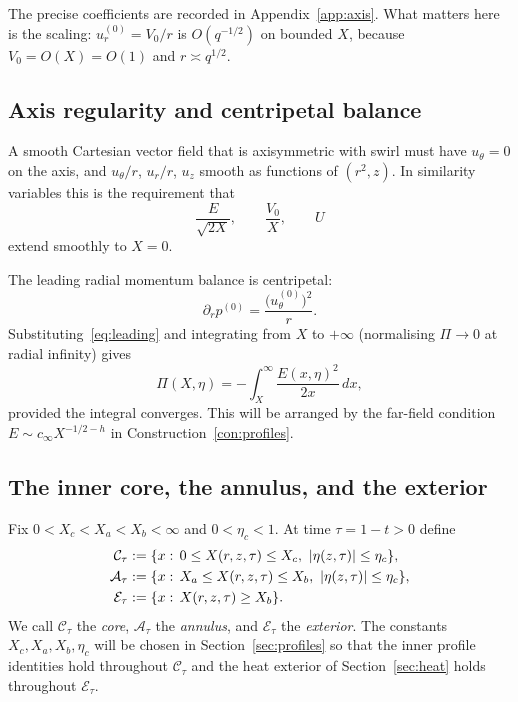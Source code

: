 The precise coefficients are recorded in Appendix~\ref{app:axis}. What matters here is the scaling: $u^{(0)}_r=V_0/r$ is $O(q^{-1/2})$ on bounded $X$, because $V_0=O(X)=O(1)$ and $r\asymp q^{1/2}$.

\subsection{Axis regularity and centripetal balance}

A smooth Cartesian vector field that is axisymmetric with swirl must have $u_\theta=0$ on the axis, and $u_\theta/r$, $u_r/r$, $u_z$ smooth as functions of $(r^2,z)$. In similarity variables this is the requirement that
\[
\frac{E}{\sqrt{2X}},\qquad
\frac{V_0}{X},\qquad
U
\]
extend smoothly to $X=0$.

The leading radial momentum balance is centripetal:
\begin{equation}
\label{eq:centrip}
\partial_r p^{(0)}=\frac{\bigl(u^{(0)}_\theta\bigr)^2}{r}.
\end{equation}
Substituting~\eqref{eq:leading} and integrating from $X$ to $+\infty$ (normalising $\Pi\to 0$ at radial infinity) gives
\begin{equation}
\label{eq:Pi}
\Pi(X,\eta)=-\int_X^\infty \frac{E(x,\eta)^2}{2x}\,dx,
\end{equation}
provided the integral converges. This will be arranged by the far-field condition $E\sim c_\infty X^{-1/2-h}$ in Construction~\ref{con:profiles}.

\subsection{The inner core, the annulus, and the exterior}
\label{sec:regions}

\begin{definition}[Regions]
\label{def:core}
Fix $0<X_c<X_a<X_b<\infty$ and $0<\eta_c<1$. At time $\tau=1-t>0$ define
\begin{align*}
\mathcal C_\tau
&:=\{x:\,0\le X(r,z,\tau)\le X_c,\ |\eta(z,\tau)|\le\eta_c\},\\
\mathcal A_\tau
&:=\{x:\,X_a\le X(r,z,\tau)\le X_b,\ |\eta(z,\tau)|\le\eta_c\},\\
\mathcal E_\tau
&:=\{x:\,X(r,z,\tau)\ge X_b\}.
\end{align*}
We call $\mathcal C_\tau$ the \emph{core}, $\mathcal A_\tau$ the \emph{annulus}, and $\mathcal E_\tau$ the \emph{exterior}. The constants $X_c,X_a,X_b,\eta_c$ will be chosen in Section~\ref{sec:profiles} so that the inner profile identities hold throughout $\mathcal C_\tau$ and the heat exterior of Section~\ref{sec:heat} holds throughout $\mathcal E_\tau$.
\end{definition}

